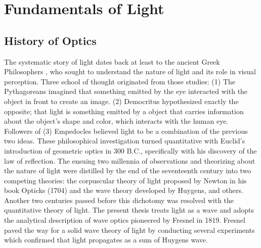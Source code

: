 \chapter{Fundamentals of Light}
\label{ch:fundamentals_of_light}


\section{History of Optics}

The systematic story of light dates back at least to the ancient Greek Philosophers \cite{Vohnsen_2004}, who sought to understand the nature of light and its role in visual perception. Three school of thought originated from those studies: (1) The Pythagoreans imagined that something emitted by the eye interacted with the object in front to create an image. (2) Democritus hypothesized exactly the opposite; that light is something emitted by a object that carries information about the object's shape and color, which interacts with the human eye. Followers of (3)  Empedocles believed light to be a combination of the previous two ideas. These philosophical investigation turned quantitative  with Euclid's introduction of geometric optics in 300 B.C.\cite{Abetti1971}, specifically with his discovery of the law of reflection. The ensuing two millennia of observations and theorizing about the nature of light were distilled by the end of the seventeenth century into two competing theories: the corpuscular theory of light proposed by Newton in his book Opticks \cite{newton_optiks} (1704) and the wave theory developed by Huygens, \cite{huygens2005} and others. Another two centuries passed before this dichotomy was resolved with the quantitative theory of light. The present thesis treats light as a wave and adopts the analytical description of wave optics pioneered by Fresnel in 1819. Fresnel paved the way for a solid wave theory of light by conducting several experiments which confirmed that light propagates as a sum of Huygens wave. 

